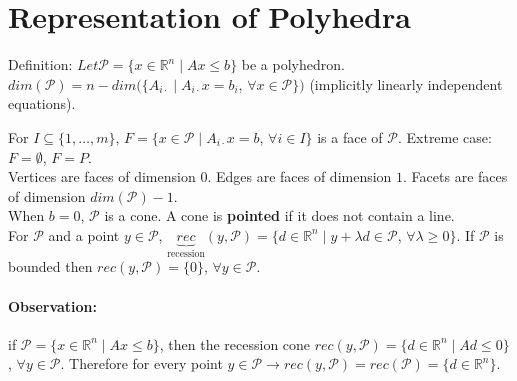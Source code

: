 \documentclass[main]{subfiles}
\begin{document}

\section{Representation of Polyhedra}
Definition: $Let \mathcal{P} = \{x \in \mathbb{R}^n \mid Ax \leq b\}$ be a 
polyhedron. $dim(\mathcal{P}) = n - dim(\{A_{i\cdot} \mid A_{i\cdot}x = b_i$, $
\forall x \in \mathcal{P} \})$ (implicitly linearly independent equations).

For $I \subseteq \{1, \dots, m\}$, $F = \{ x \in \mathcal{P} \mid A_{i\cdot} x = 
b$, $\forall i \in I \}$ is a face of $\mathcal{P}$.
Extreme case: $F = \emptyset$, $F = P$.\\

Vertices are faces of dimension $0$. Edges are faces of dimension $1$. Facets 
are faces of dimension $dim(\mathcal{P})-1$.\\

When $b = 0$, $\mathcal{P}$ is a cone. A cone is \textbf{pointed} if it does not 
contain a line.\\

For $\mathcal{P}$ and a point $y \in \mathcal{P}$, $\underbrace{rec}
_{\text{recession}}(y, \mathcal{P}) = \{ d \in \mathbb{R}^n \mid y + \lambda d 
\in \mathcal{P}$, $\forall \lambda \geq 0 \}$. If $\mathcal{P}$ is bounded then 
$rec(y, \mathcal{P}) = \{ 0 \}$, $\forall y \in \mathcal{P}$. \\

\paragraph{Observation:}
if $\mathcal{P} = \{x \in \mathbb{R}^n \mid Ax \leq b \}$, then the recession
cone $rec(y, \mathcal{P}) = \{d \in \mathbb{R}^n \mid Ad \leq 0 \}$, $\forall y
\in \mathcal{P}$. Therefore for every point $y \in \mathcal{P} \rightarrow
rec(y, \mathcal{P}) = rec(\mathcal{P}) = \{ d \in \mathbb{R}^n \}$.
\end{document}
